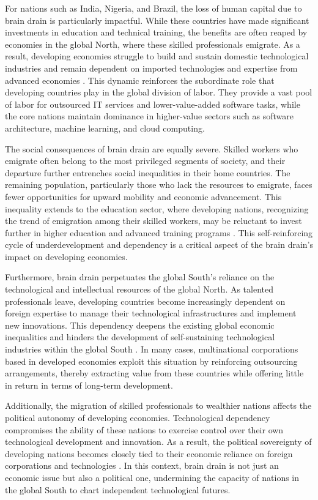 For nations such as India, Nigeria, and Brazil, the loss of human capital due to brain drain is particularly impactful. While these countries have made significant investments in education and technical training, the benefits are often reaped by economies in the global North, where these skilled professionals emigrate. As a result, developing economies struggle to build and sustain domestic technological industries and remain dependent on imported technologies and expertise from advanced economies \cite[pp.~155-157]{adepoju2010}. This dynamic reinforces the subordinate role that developing countries play in the global division of labor. They provide a vast pool of labor for outsourced IT services and lower-value-added software tasks, while the core nations maintain dominance in higher-value sectors such as software architecture, machine learning, and cloud computing.

The social consequences of brain drain are equally severe. Skilled workers who emigrate often belong to the most privileged segments of society, and their departure further entrenches social inequalities in their home countries. The remaining population, particularly those who lack the resources to emigrate, faces fewer opportunities for upward mobility and economic advancement. This inequality extends to the education sector, where developing nations, recognizing the trend of emigration among their skilled workers, may be reluctant to invest further in higher education and advanced training programs \cite[pp.~103-105]{docquier2012}. This self-reinforcing cycle of underdevelopment and dependency is a critical aspect of the brain drain's impact on developing economies.

Furthermore, brain drain perpetuates the global South's reliance on the technological and intellectual resources of the global North. As talented professionals leave, developing countries become increasingly dependent on foreign expertise to manage their technological infrastructures and implement new innovations. This dependency deepens the existing global economic inequalities and hinders the development of self-sustaining technological industries within the global South \cite[pp.~131-133]{carrington1999}. In many cases, multinational corporations based in developed economies exploit this situation by reinforcing outsourcing arrangements, thereby extracting value from these countries while offering little in return in terms of long-term development.

Additionally, the migration of skilled professionals to wealthier nations affects the political autonomy of developing economies. Technological dependency compromises the ability of these nations to exercise control over their own technological development and innovation. As a result, the political sovereignty of developing nations becomes closely tied to their economic reliance on foreign corporations and technologies \cite[pp.~62-65]{faini2006}. In this context, brain drain is not just an economic issue but also a political one, undermining the capacity of nations in the global South to chart independent technological futures.

